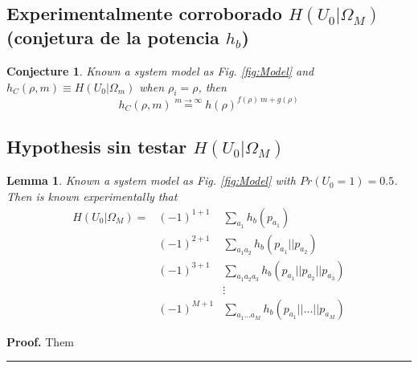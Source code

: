 \documentclass[a4paper,10pt]{article}
\newtheorem{mylemma}[mytheorem]{Lemma}
\newtheorem{conjecture}[mytheorem]{Conjecture}
\newenvironment{myproof}[1][Proof]{\textbf{#1.} }{\ \rule{0.5em}{0.5em}}
\begin{document}
\subsection{Experimentalmente corroborado $H(U_0|\Omega_M)$ (conjetura de la potencia $h_b$)}
\label{subsec:h0OmegaM_2}


\begin{mdframed}[style=MDFStyGrayScreen]
\begin{conjecture}
 \label{lemm:h0OmegaM_2}
 Known a system model as Fig. \ref{fig:Model} and $h_{C}(\rho,m)\equiv H(U_0|\Omega_m)$ when $\rho_i=\rho$, then
\begin{equation}\label{eq:Hconjecture1}
h_{C}(\rho,m)  \stackrel{m \rightarrow \infty }{=} h(\rho)^{f(\rho)~m+g(\rho)}
\end{equation}
\end{conjecture}
\end{mdframed}

\subsection{Hypothesis sin testar $H(U_0|\Omega_M)$}
\label{subsec:h0OmegaM}

\begin{mylemma}
 \label{lemm:1}
  Known a system model as Fig. \ref{fig:Model} with $Pr(U_0=1)=0.5$. Then is known 
experimentally that
\begin{equation}
 \begin{matrix}
 H(U_0|\Omega_M)= & (-1)^{1+1} & \sum \limits_{a_1}         h_b(p_{a_1}) \\
 ~                & (-1)^{2+1} & \sum \limits_{a_1 a_2}     h_b(p_{a_1}||p_{a_2}) \\ 
 ~                & (-1)^{3+1}  & \sum \limits_{a_1 a_2 a_3} h_b(p_{a_1}||p_{a_2}||p_{a_3}) \\ 
 ~                & ~ & \vdots \\
 ~                & (-1)^{M+1}  & \sum \limits_{a_1 ... a_M} h_b(p_{a_1}|| ... ||p_{a_M}) 
 \end{matrix}
\end{equation}

\end{mylemma}
\begin{myproof}
Them
\end{myproof}
\end{document}
